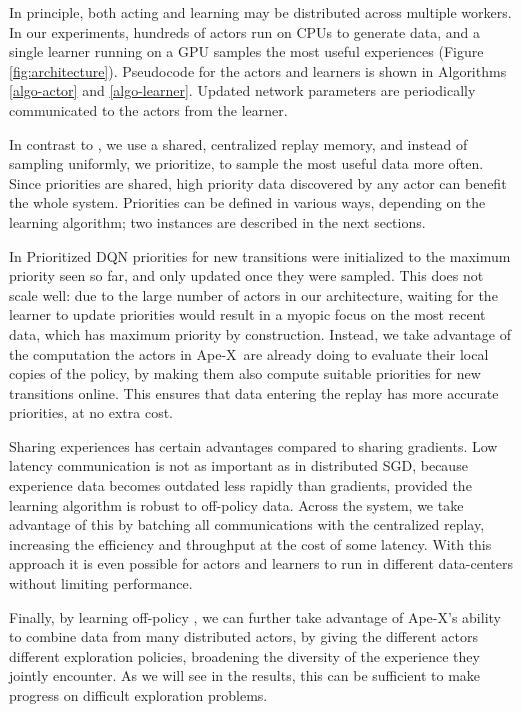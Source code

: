 \documentclass{article} %
\def\apex{Ape-X}
\begin{document}
In principle, both acting and learning may be distributed across multiple workers. In our experiments, hundreds of actors run on CPUs to generate data, and a single learner running on a GPU samples the most useful experiences (Figure \ref{fig:architecture}).  Pseudocode for the actors and learners is shown in Algorithms \ref{algo-actor} and \ref{algo-learner}. Updated network parameters are periodically communicated to the actors from the learner.

In contrast to \citet{gorila}, we use a shared, centralized replay memory, and instead of sampling uniformly, we prioritize, to sample the most useful data more often. Since priorities are shared, high priority data discovered by any actor can benefit the whole system. Priorities can be defined in various ways, depending on the learning algorithm; two instances are described in the next sections.

In Prioritized DQN \citep{prioritized-replay} priorities for new transitions were initialized to the maximum priority seen so far, and only updated once they were sampled. This does not scale well: due to the large number of actors in our architecture, waiting for the learner to update priorities would result in a myopic focus on the most recent data, which has maximum priority by construction. Instead, we take advantage of the computation the actors in \apex\ are already doing to evaluate their local copies of the policy, by making them also compute suitable priorities for new transitions online. This ensures that data entering the replay has more accurate priorities, at no extra cost.

Sharing experiences has certain advantages compared to sharing gradients. Low latency communication is not as important as in distributed SGD, because experience data becomes outdated less rapidly than gradients, provided the learning algorithm is robust to off-policy data. Across the system, we take advantage of this by batching all communications with the centralized replay, increasing the efficiency and throughput at the cost of some latency. With this approach it is even possible for actors and learners to run in different data-centers without limiting performance.

Finally, by learning off-policy \citep[cf.][]{SuttonBarto:1998,SuttonBarto:2017}, we can further take advantage of \apex's ability to combine data from many distributed actors, by giving the different actors different exploration policies, broadening the diversity of the experience they jointly encounter. As we will see in the results, this can be sufficient to make progress on difficult exploration problems.
\end{document}
